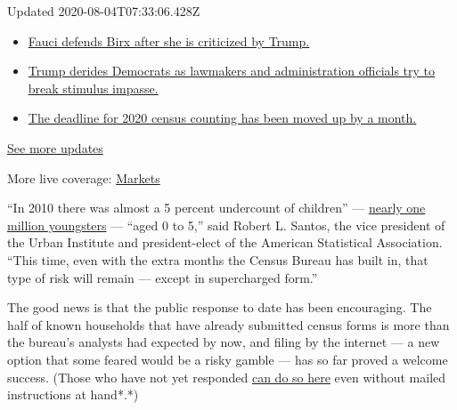 Updated 2020-08-04T07:33:06.428Z

\begin{itemize}
\tightlist
\item
  \href{https://www.nytimes3xbfgragh.onion/2020/08/03/world/coronavirus-covid-19.html?action=click\&pgtype=Article\&state=default\&region=MAIN_CONTENT_1\&context=storylines_live_updates\#link-4547638f}{Fauci
  defends Birx after she is criticized by Trump.}
\item
  \href{https://www.nytimes3xbfgragh.onion/2020/08/03/world/coronavirus-covid-19.html?action=click\&pgtype=Article\&state=default\&region=MAIN_CONTENT_1\&context=storylines_live_updates\#link-15e7f995}{Trump
  derides Democrats as lawmakers and administration officials try to
  break stimulus impasse.}
\item
  \href{https://www.nytimes3xbfgragh.onion/2020/08/03/world/coronavirus-covid-19.html?action=click\&pgtype=Article\&state=default\&region=MAIN_CONTENT_1\&context=storylines_live_updates\#link-e5a2cda}{The
  deadline for 2020 census counting has been moved up by a month.}
\end{itemize}

\href{https://www.nytimes3xbfgragh.onion/2020/08/03/world/coronavirus-covid-19.html?action=click\&pgtype=Article\&state=default\&region=MAIN_CONTENT_1\&context=storylines_live_updates}{See
more updates}

More live coverage:
\href{https://www.nytimes3xbfgragh.onion/live/2020/08/03/business/stock-market-today-coronavirus?action=click\&pgtype=Article\&state=default\&region=MAIN_CONTENT_1\&context=storylines_live_updates}{Markets}

``In 2010 there was almost a 5 percent undercount of children'' ---
\href{https://www.census.gov/content/dam/Census/library/working-papers/2014/demo/2014-undercount-children.pdf}{nearly
one million youngsters} --- ``aged 0 to 5,'' said Robert L. Santos, the
vice president of the Urban Institute and president-elect of the
American Statistical Association. ``This time, even with the extra
months the Census Bureau has built in, that type of risk will remain ---
except in supercharged form.''

The good news is that the public response to date has been encouraging.
The half of known households that have already submitted census forms is
more than the bureau's analysts had expected by now, and filing by the
internet --- a new option that some feared would be a risky gamble ---
has so far proved a welcome success. (Those who have not yet responded
\href{https://2020census.gov}{can do so here} even without mailed
instructions at hand*.*)

